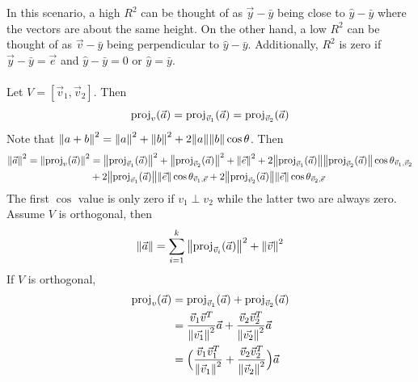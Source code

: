 \documentclass[12pt]{article}
\begin{document}
In this scenario, a high $R^2$ can be thought of as $\vec{y} - \bar{y}$ being close to $\hat{y} - \bar{y}$ where the vectors are about the same height. On the other hand, a low $R^2$ can be thought of as $\vec{v} - \bar{y}$ being perpendicular to $\hat{y} - \bar{y}$. Additionally, $R^2$ is zero if $\vec{y} - \bar{y} = \vec{e}$ and $\hat{y} - \bar{y} = 0$ or $\hat{y} = \bar{y}$. \\~\\
Let $V = [\vec{v}_1,\vec{v}_2]$. Then $$\text{proj}_{ v } ( \vec{a} ) = \text{proj}_{ \vec{v}_1 } ( \vec{a} ) = \text{proj}_{ \vec{v}_2 } ( \vec{a} ) $$ 
Note that $\norm{a+b}^2 = \norm{a}^2 + \norm{b}^2 + 2\norm{a}\norm{b}\cos \theta $. Then 
$$ \begin{aligned} \norm{\vec{a}}^2 = \norm{\text{proj}_{ v } ( \vec{a} )}^2 &= \norm{\text{proj}_{ \vec{v}_1 } ( \vec{a} )}^2 + \norm{\text{proj}_{ \vec{v}_2 } ( \vec{a} )}^2 + \norm{\vec{e}}^2 + 2\norm{\text{proj}_{ \vec{v}_1 } ( \vec{a} )}\norm{\text{proj}_{ \vec{v}_2 } ( \vec{a} )}\cos \theta_{\vec{v}_1,\vec{v}_2} \\ &+ 2\norm{\text{proj}_{ \vec{v}_1 } ( \vec{a} )}\norm{\vec{e}}\cos \theta_{\vec{v}_1, \vec{e}} + 2 \norm{\text{proj}_{ \vec{v}_2 } ( \vec{a} )}\norm{\vec{e}}\cos\theta_{\vec{v}_2,\vec{e}} \end{aligned} $$ 
The first $\cos$ value is only zero if $v_1 \perp v_2$ while the latter two are always zero. \\ 
Assume $V$ is orthogonal, then 
$$ \norm{\vec{a}} = \sum_{i=1}^k \norm{\text{proj}_{ \vec{v}_i } ( \vec{a} )}^2 + \norm{\vec{v}}^2$$ 
If $V$ is orthogonal, $$ \begin{aligned} 
\text{proj}_{ v } ( \vec{a} ) &= \text{proj}_{ \vec{v}_1 } ( \vec{a} ) + \text{proj}_{ \vec{v}_2 } ( \vec{a} ) \\ &= \frac{\vec{v}_1\vec{v}^T}{\norm{\vec{v_1}}^2}\vec{a} + \frac{\vec{v}_2\vec{v}_2^T}{\norm{\vec{v_2}}^2}\vec{a} \\ &= \Big( \frac{\vec{v}_1\vec{v}_1^T}{\norm{\vec{v}_1}^2} + \frac{\vec{v}_2\vec{v}_2^T}{\norm{\vec{v}_2}^2} \Big)\vec{a} \end{aligned} $$ 
\end{document}
